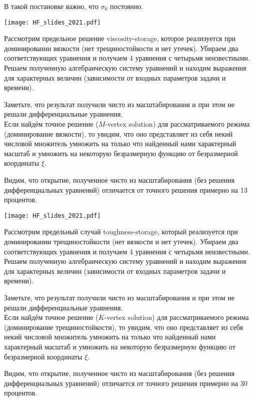 \documentclass[main.tex]{subfiles}
\begin{document}
В такой постановке важно, что $\sigma_0$ постоянно.

\texttt{[image: HF\_slides\_2021.pdf]}

Рассмотрим предельное решение viscosity-storage, которое реализуется при доминировании вязкости (нет трещиностойкости и нет утечек).
Убираем два соответствующих уравнения и получаем 4 уравнения с четырьмя неизвестными.
Решаем полученную алгебраическую систему уравнений и находим выражения для характерных величин (зависимости от входных параметров задачи и времени).

Заметьте, что результат получили чисто из масштабирования и при этом не решали дифференциальные уравнения.
\\

Если найдём точное решение ($M$-vertex solution) для рассматриваемого режима (доминирование вязкости), то увидим, что оно представляет из себя некий числовой множитель умножить на только что найденный нами характерный масштаб и умножить на некоторую безразмерную функцию от безразмерной координаты $\xi$.

Видим, что открытие, полученное чисто из масштабирования (без решения дифференциальных уравнений) отличается от точного решения примерно на 13 процентов.

\texttt{[image: HF\_slides\_2021.pdf]}

Рассмотрим предельный случай toughness-storage, который реализуется при доминировании трещиностойкости (нет вязкости и нет утечек).
Убираем два соответствующих уравнения и получаем 4 уравнения с четырьмя неизвестными.
Решаем полученную алгебраическую систему уравнений и находим выражения для характерных величин (зависимости от входных параметров задачи и времени).

Заметьте, что результат получили чисто из масштабирования и при этом не решали дифференциальные уравнения.
\\

Если найдём точное решение ($K$-vertex solution) для рассматриваемого режима (доминирование трещиностойкости), то увидим, что оно представляет из себя некий числовой множитель умножить на только что найденный нами характерный масштаб и умножить на некоторую безразмерную функцию от безразмерной координаты $\xi$.

Видим, что открытие, полученное чисто из масштабирования (без решения дифференциальных уравнений) отличается от точного решения примерно на 30 процентов.
\\
\end{document}
